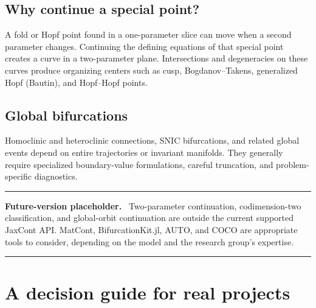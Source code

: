 \documentclass[11pt,oneside]{book}
\newenvironment{futurebox}
  {\par\medskip\noindent\begin{minipage}{\textwidth}
   \color{black!55}\rule{\textwidth}{0.8pt}\par
   \textbf{Future-version placeholder.}\ \color{black}}
  {\par\color{black!55}\rule{\textwidth}{0.8pt}
   \end{minipage}\par\medskip}
\begin{document}
\section{Why continue a special point?}

A fold or Hopf point found in a one-parameter slice can move when a second
parameter changes. Continuing the defining equations of that special point
creates a curve in a two-parameter plane. Intersections and degeneracies on
these curves produce organizing centers such as cusp, Bogdanov--Takens,
generalized Hopf (Bautin), and Hopf--Hopf points.

\section{Global bifurcations}

Homoclinic and heteroclinic connections, SNIC bifurcations, and related global
events depend on entire trajectories or invariant manifolds. They generally
require specialized boundary-value formulations, careful truncation, and
problem-specific diagnostics.

\begin{futurebox}
Two-parameter continuation, codimension-two classification, and global-orbit
continuation are outside the current supported JaxCont API. MatCont,
BifurcationKit.jl, AUTO, and COCO are appropriate tools to consider, depending
on the model and the research group’s expertise.
\end{futurebox}

\chapter{A decision guide for real projects}
\end{document}
